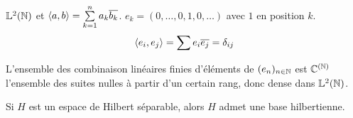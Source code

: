 \begin{example}
	$\mathbb{L}^2(\mathbb{N})$  et $\left\langle a, b \right\rangle = \sum\limits_{k=1}^n a_k \overline{b_k}$.
	$e_k = (0, \ldots, 0, 1, 0, \ldots)$ avec $1$ en position $k$.
	$$ \left\langle e_i, e_j \right\rangle = \sum e_i \overline{e_j} = \delta_{ij} $$

	L'ensemble des combinaison linéaires finies d'éléments de $(e_n)_{n\in \mathbb{N}}$ est $\mathbb{C}^{(\mathbb{N})}$ l'ensemble des suites nulles à partir d'un certain rang, donc dense dans $\mathbb{L}^2(\mathbb{N})$.
\end{example}

\begin{example}
\end{example}


\begin{theorem}
	Si $H$ est un espace de Hilbert séparable, alors $H$ admet une base hilbertienne.
\end{theorem}

